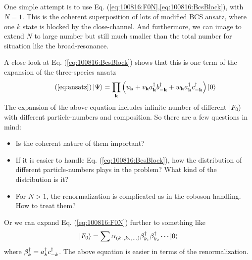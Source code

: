\subsection{}
One simple attempt is to use Eq. (\ref{eq:100816:F0N},\ref{eq:100816:BcsBlock}),  with $N=1$.  This is the coherent superposition of lots of modified BCS ansatz, where one $k$ state is blocked by the close-channel.  And furthermore, we can image to extend $N$ to large number but still much smaller than the total number for situation like the broad-resonance.  

A close-look at Eq. (\ref{eq:100816:BcsBlock}) shows that this is one term of the expansion of the three-species ansatz
\begin{equation}\tag{\ref{eq:ansatz}}
 \ket{\Psi}=\prod_\vk\br{u_\vk+v_\vk{}a^\dg_\vk{}b^\dg_{-\vk}+w_\vk{}a^\dg_\vk{}c^\dg_{-\vk}}\ket{0}
\end{equation}
The expansion of the above equation includes infinite number of different $\left|F_{0}\right>$ with different particle-numbers and composition.  So there are a few questions in mind:

\begin{itemize}
\item Is the coherent nature of them important?
\item If it is easier to handle Eq. (\ref{eq:100816:BcsBlock}), how the distribution of different particle-numbers plays in the problem?  What kind of the distribution is it? 
\item For $N>1$, the renormalization is complicated as in the coboson handling.  How to treat them? 
\end{itemize}

Or we can expand Eq. (\ref{eq:100816:F0N}) further to something like 
\begin{equation}
\left|F_{0}\right>=\sum\alpha_{(k_1,k_{2},...)}\beta^{\dagger}_{k_{1}}\beta^{\dagger}_{k_{2}}\cdots\left|0\right>
\end{equation}
where $\beta^{\dagger}_{k}=a^{\dagger}_{k}c^{\dagger}_{-k}$.
The above equation is easier in terms of the renormalization.  